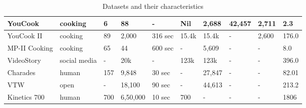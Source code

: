 \begin{table}[H]
\begin{tabular}{|l|l|l|l|l|l|l|l|l|l|}
		YouCook                                                    & cooking         & 6                  & 88                & -                & Nil              & 2,688           & 42,457           & 2,711          & 2.3                \\ \hline
		YouCook II                                                 & cooking         & 89                 & 2,000             & 316 sec          & 15.4k            & 15.4k           & -                & 2,600          & 176.0              \\ \hline
		MP-II Cooking                                              & cooking         & 65                 & 44                & 600 sec          & -                & 5,609           & -                & -              & 8.0                \\ \hline
		VideoStory                                                 & social media    & -                  & 20k               & -                & 123k             & 123k            & -                & -              & 396.0              \\ \hline
		Charades                                                   & human           & 157                & 9,848             & 30 sec           & -                & 27,847          & -                & -              & 82.01              \\ \hline
		VTW                                                        & open            & -                  & 18,100            & 90 sec           & -                & 44,613          & -                & -              & 213.2              \\ \hline
		Kinetics 700                                               & human           & 700                & 6,50,000          & 10 sec           & 700              & -               & -                & -              & 1806               \\ \hline
	\end{tabular}

\centering
\caption{Datasets and their characteristics}
\label{tab: datasets}

\end{table}
